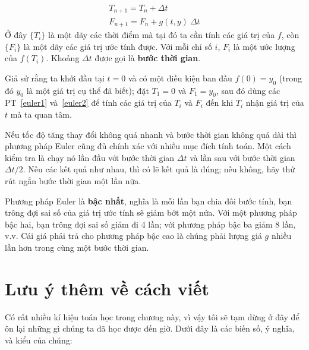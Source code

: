 \documentclass[12pt]{book}
\begin{document}
\begin{eqnarray}
\label{euler1}
T_{n+1} = T_n + \Delta t           \\
\label{euler2}
F_{n+1} = F_n + g(t,y)~\Delta t
\end{eqnarray}
%
Ở đây $\{T_i\}$ là một dãy các thời điểm mà tại đó ta cần tính các
giá trị của $f$, còn $\{F_i\}$ là một dãy các giá trị ước tính được. Với
mỗi chỉ số $i$, $F_i$ là một ước lượng của $f(T_i)$. Khoảng $\Delta t$
được gọi là {\bf bước thời gian}.

Giả sử rằng ta khởi đầu tại $t=0$ và có một điều kiện ban đầu
$f(0) = y_0$ (trong đó $y_0$ là một giá trị cụ thể đã biết); đặt
$T_1 = 0$ và $F_1 = y_0$, sau đó dùng các PT~\ref{euler1} 
và~\ref{euler2} để tính các giá trị của $T_i$ và $F_i$ đến khi $T_i$
nhận giá trị của $t$ mà ta quan tâm.

Nếu tốc độ tăng thay đổi không quá nhanh và bước thời gian không 
quá dài thì phương pháp Euler cũng đủ chính xác với nhiều mục đích
tính toán. Một cách kiểm tra là chạy nó lần đầu với bước thời gian 
$\Delta t$ và lần sau với bước thời gian $\Delta t/2$. Nếu các kết quả
như nhau, thì có lẽ kết quả là đúng; nếu không, hãy thử rút ngắn
bước thời gian một lần nữa.

Phương pháp Euler là {\bf bậc nhất}, nghĩa là mỗi lần bạn chia đôi
bước tính, bạn trông đợi sai số của giá trị ước tính sẽ giảm bớt 
một nửa. Với một phương pháp bậc hai, bạn trông đợi sai số giảm
đi 4 lần; với phương pháp bậc ba giảm 8 lần, v.v. Cái giá phải trả
cho phương pháp bậc cao là chúng phải lượng giá $g$ nhiều lần hơn
trong cùng một bước thời gian.


\section{Lưu ý thêm về cách viết}

Có rất nhiều kí hiệu toán học trong chương này, vì vậy tôi sẽ tạm dừng
ở đây để ôn lại những gì chúng ta đã học được đến giờ. Dưới đây là
các biến số, ý nghĩa, và kiểu của chúng:
\end{document}
